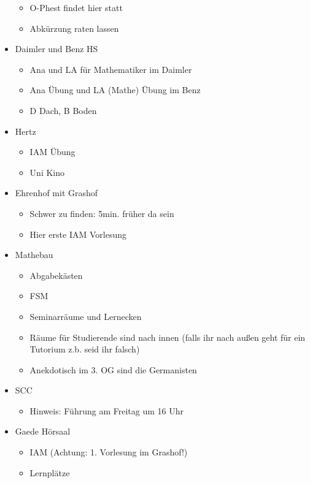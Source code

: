 \documentclass[10pt,ngerman]{scrartcl}
\begin{document}
\begin{multicols}{2}
\begin{itemize}
\begin{itemize}
            \item O-Phest findet hier statt
            \item Abkürzung raten lassen
        \end{itemize}
    \item Daimler und Benz HS
        \begin{itemize}
            \item Ana und LA für Mathematiker im Daimler
            \item Ana Übung und LA (Mathe) Übung im Benz
            \item D Dach, B Boden
        \end{itemize}
    \item Hertz
        \begin{itemize}
            \item IAM Übung
            \item Uni Kino
        \end{itemize}
    \item Ehrenhof mit Grashof
        \begin{itemize}
            \item Schwer zu finden: 5min. früher da sein
            \item Hier erste IAM Vorlesung
        \end{itemize}
    \item Mathebau
        \begin{itemize}
            \item Abgabekästen
            \item FSM
            \item Seminarräume und Lernecken
            \item Räume für Studierende sind nach innen (falls ihr nach außen geht für
                ein Tutorium z.b. seid ihr falsch)
            \item Anekdotisch im 3. OG sind die Germanisten
        \end{itemize}
    \item SCC
        \begin{itemize}
            \item Hinweis: Führung am Freitag um 16 Uhr
        \end{itemize}
    \item Gaede Hörsaal
        \begin{itemize}
            \item IAM (Achtung: 1. Vorlesung im Grashof!)
            \item Lernplätze

\end{itemize}
\end{itemize}
\end{multicols}
\end{document}
